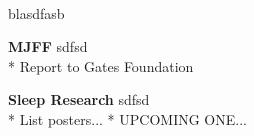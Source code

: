  \\
blasdfasb
\begin{itemize*}
  \item\leftandright
    {\textbf{MJFF}}
    {\small{sdfsd}} \\  
    * Report to Gates Foundation
  \item\leftandright
    {\textbf{Sleep Research}}
    {\small{sdfsd}} \\  
    * List posters...
    * UPCOMING ONE...
\end{itemize*}

